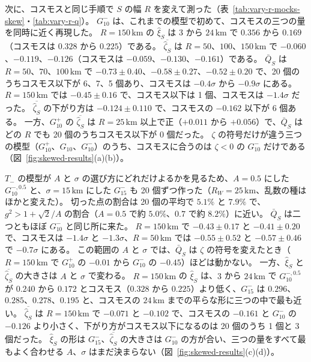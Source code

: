 \documentclass[a4paper,11pt]{ltjsarticle}
\begin{document}
次に、コスモスと同じ手順で $S$ の幅 $R$ を変えて測った（表~\ref{tab:vary-r-mocks-skew}・\ref{tab:vary-r-q}）。
$G_{10}^{-}$ は、これまでの模型で初めて、コスモスの三つの量を同時に近く再現した。
$R = 150\,\mathrm{km}$ の $\hat\xi_S$ は $3$ から $24\,\mathrm{km}$ で $0.356$ から $0.169$（コスモスは $0.328$ から $0.225$）である。
$\overline{\hat\zeta_S}$ は $R = 50$、$100$、$150\,\mathrm{km}$ で $-0.060$、$-0.119$、$-0.126$（コスモスは $-0.059$、$-0.130$、$-0.161$）である。
$\bar Q_S$ は $R = 50$、$70$、$100\,\mathrm{km}$ で $-0.73 \pm 0.40$、$-0.58 \pm 0.27$、$-0.52 \pm 0.20$ で、20 個のうちコスモス以下が 6、7、5 個あり、コスモスは $-0.4\sigma$ から $-0.9\sigma$ にある。
$R = 150\,\mathrm{km}$ では $-0.45 \pm 0.16$ で、コスモス以下は 1 個、コスモスは $-1.4\sigma$ だった。
$\overline{\hat\zeta_S}$ の下がり方は $-0.124 \pm 0.110$ で、コスモスの $-0.162$ 以下が 6 個ある。
一方、$G_{10}^{+}$ の $\overline{\hat\zeta_S}$ は $R = 25\,\mathrm{km}$ 以上で正（$+0.011$ から $+0.056$）で、$\bar Q_S$ はどの $R$ でも 20 個のうちコスモス以下が 0 個だった。
$\zeta$ の符号だけが違う三つの模型（$G_{10}^{+}$、$G_{10}$、$G_{10}^{-}$）のうち、コスモスに合うのは $\zeta < 0$ の $G_{10}^{-}$ だけである（図~\ref{fig:skewed-results}(a)(b)）。

$T_-$ の模型が $A$ と $\sigma$ の選び方にどれだけよるかを見るため、$A = 0.5$ にした $G_{10}^{-,0.5}$ と、$\sigma = 15\,\mathrm{km}$ にした $G_{15}^{-}$ も 20 個ずつ作った（$R_W = 25\,\mathrm{km}$、乱数の種はほかと変えた）。
切った点の割合は 20 個の平均で $5.1\%$ と $7.9\%$ で、$g^2 > 1 + \sqrt{2}/A$ の割合（$A = 0.5$ で約 $5.0\%$、$0.7$ で約 $8.2\%$）に近い。
$\bar Q_S$ は二つともほぼ $G_{10}^{-}$ と同じ所に来た。
$R = 150\,\mathrm{km}$ で $-0.43 \pm 0.17$ と $-0.41 \pm 0.20$ で、コスモスは $-1.4\sigma$ と $-1.3\sigma$、$R = 50\,\mathrm{km}$ では $-0.55 \pm 0.52$ と $-0.57 \pm 0.46$ で $-0.7\sigma$ にある。
この範囲の $A$ と $\sigma$ では、$\bar Q_S$ は $\zeta$ の符号を変えたとき（$R = 150\,\mathrm{km}$ で $G_{10}^{+}$ の $-0.01$ から $G_{10}^{-}$ の $-0.45$）ほどは動かない。
一方、$\hat\xi_S$ と $\overline{\hat\zeta_S}$ の大きさは $A$ と $\sigma$ で変わる。
$R = 150\,\mathrm{km}$ の $\hat\xi_S$ は、$3$ から $24\,\mathrm{km}$ で $G_{10}^{-,0.5}$ が $0.240$ から $0.172$ とコスモス（$0.328$ から $0.225$）より低く、$G_{15}^{-}$ は $0.296$、$0.285$、$0.278$、$0.195$ と、コスモスの $24\,\mathrm{km}$ までの平らな形に三つの中で最も近い。
$\overline{\hat\zeta_S}$ は $R = 150\,\mathrm{km}$ で $-0.071$ と $-0.102$ で、コスモスの $-0.161$ と $G_{10}^{-}$ の $-0.126$ より小さく、下がり方がコスモス以下になるのは 20 個のうち 1 個と 3 個だった。
$\hat\xi_S$ の形は $G_{15}^{-}$、$\overline{\hat\zeta_S}$ の大きさは $G_{10}^{-}$ の方が合い、三つの量をすべて最もよく合わせる $A$、$\sigma$ はまだ決まらない（図~\ref{fig:skewed-results}(c)(d)）。
\end{document}
